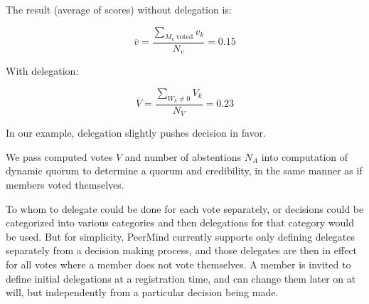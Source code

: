 \documentclass{sigchi}
\begin{document}
The result (average of scores) without delegation is:

\begin{displaymath}
\overline{v} = \frac{\sum_{M_k~\mathrm{voted}} v_k}{N_v} = 0.15
\end{displaymath}

With delegation:

\begin{displaymath}
\overline{V} = \frac{\sum_{W_k \ne 0} V_k}{N_V} = 0.23
\end{displaymath}

In our example, delegation slightly pushes decision in favor.

We pass computed votes $V$ and number of abstentions $N_A$ into computation of dynamic quorum to determine
a quorum and credibility, in the same manner as if members voted themselves.


To whom to delegate could be done for each vote separately, or decisions could be categorized into various
categories and then delegations for that category would be used.
But for simplicity, PeerMind currently supports only defining delegates separately from a decision making process,
and those delegates are then in effect for all votes where a member does not vote themselves.
A member is invited to define initial delegations at a registration time, and can change them later on at will,
but independently from a particular decision being made.
\end{document}
